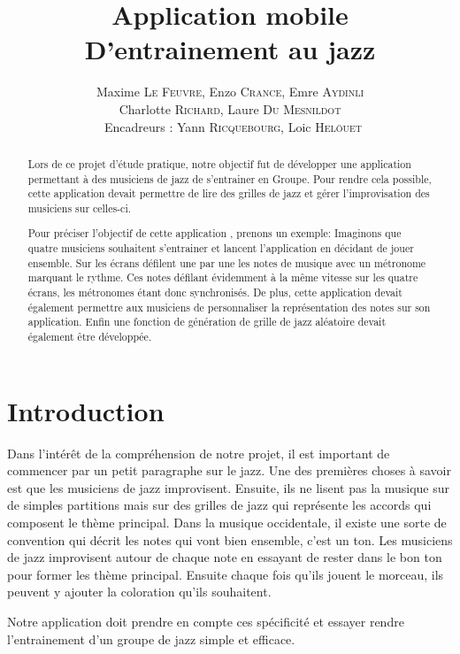 \documentclass[a4paper,11pt]{article}
\title{ \textbf{Application mobile \\
    D'entrainement au jazz} }
\author{Maxime \textsc{Le Feuvre}, Enzo \textsc{Crance}, Emre \textsc{Aydinli}\\
        Charlotte \textsc{Richard}, Laure \textsc{Du Mesnildot} \\
        \
        Encadreurs : Yann \textsc{Ricquebourg}, Loic \textsc{Hel\"ouet} }
\date{}                    %
\begin{document}
\maketitle                 %
\thispagestyle{empty}      %



\begin{abstract}
Lors de ce projet d'étude pratique, notre objectif fut de développer une application permettant à des musiciens de jazz de s'entrainer en Groupe.
Pour rendre cela possible, cette application devait permettre de lire des grilles de jazz et gérer l'improvisation des musiciens sur celles-ci.

Pour préciser l'objectif de cette application , prenons un exemple:
Imaginons que quatre musiciens souhaitent s'entrainer et lancent l'application en décidant de jouer ensemble.
Sur les écrans défilent une par une les notes de musique avec un métronome marquant le rythme.
Ces notes défilant évidemment à la même vitesse sur les quatre écrans, les métronomes étant donc synchronisés.
De plus, cette application devait également permettre aux musiciens de personnaliser la représentation des notes sur son application. Enfin une fonction de génération de grille de jazz aléatoire devait également être développée.
 

\end{abstract} 


\section{Introduction}  
Dans l'intérêt de la compréhension de notre projet, il est important de commencer par un petit paragraphe sur le jazz.
Une des premières choses à savoir est que les musiciens de jazz improvisent. Ensuite, ils ne lisent pas la musique sur de simples partitions mais sur des grilles de jazz qui représente les accords qui composent le thème principal.
Dans la musique occidentale, il existe une sorte de convention qui décrit les notes qui vont bien ensemble, c'est un ton.
Les musiciens de jazz improvisent autour de chaque note en essayant de rester dans le bon ton pour former les thème principal. Ensuite chaque fois qu'ils jouent le morceau, ils peuvent y ajouter la coloration qu'ils souhaitent.

Notre application doit prendre en compte ces spécificité et essayer rendre l'entrainement d'un groupe de jazz simple et efficace.
\end{document}

